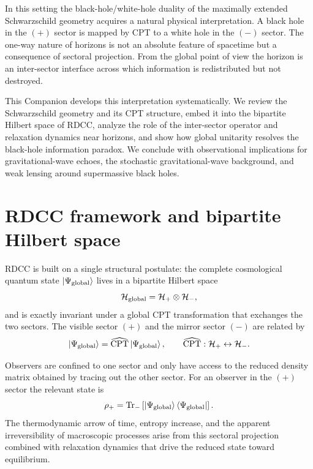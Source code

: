 \documentclass[11pt,a4paper]{article}
\begin{document}
In this setting the black-hole/white-hole duality of the maximally extended Schwarzschild geometry acquires a natural physical interpretation. A black hole in the $(+)$ sector is mapped by CPT to a white hole in the $(-)$ sector. The one-way nature of horizons is not an absolute feature of spacetime but a consequence of sectoral projection. From the global point of view the horizon is an inter-sector interface across which information is redistributed but not destroyed.

This Companion develops this interpretation systematically. We review the Schwarzschild geometry and its CPT structure, embed it into the bipartite Hilbert space of RDCC, analyze the role of the inter-sector operator and relaxation dynamics near horizons, and show how global unitarity resolves the black-hole information paradox. We conclude with observational implications for gravitational-wave echoes, the stochastic gravitational-wave background, and weak lensing around supermassive black holes.

\section{RDCC framework and bipartite Hilbert space}

RDCC is built on a single structural postulate: the complete cosmological quantum state 
\(\ket{\Psi_{\rm global}}\) lives in a bipartite Hilbert space
\begin{equation}
\mathcal{H}_{\rm global} = \mathcal{H}_{+} \otimes \mathcal{H}_{-},
\end{equation}
and is exactly invariant under a global CPT transformation that exchanges the two sectors. 
The visible sector \((+)\) and the mirror sector \((-)\) are related by
\begin{equation}
\ket{\Psi_{\rm global}} = \widehat{\mathrm{CPT}} \ket{\Psi_{\rm global}}, 
\qquad 
\widehat{\mathrm{CPT}} : \mathcal{H}_{+} \leftrightarrow \mathcal{H}_{-}.
\end{equation}

Observers are confined to one sector and only have access to the reduced density matrix obtained by tracing out the other sector. For an observer in the \((+)\) sector the relevant state is
\begin{equation}
\rho_{+} = \mathrm{Tr}_{-} \left[ \ket{\Psi_{\rm global}} \bra{\Psi_{\rm global}} \right].
\end{equation}
The thermodynamic arrow of time, entropy increase, and the apparent irreversibility of macroscopic processes arise from this sectoral projection combined with relaxation dynamics that drive the reduced state toward equilibrium.
\end{document}
